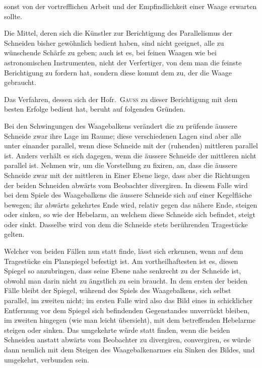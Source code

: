 \par\clearpage
{}
\noindent sonst von der vortrefflichen Arbeit und der Empfindlichkeit einer Waage erwarten sollte.

Die Mittel, deren sich die Künstler zur Berichtigung des Parallelismus der Schneiden bisher gewöhnlich bedient haben, sind nicht geeignet, alle zu wünschende Schärfe zu geben; auch ist es, bei feinen Waagen wie bei astronomischen Instrumenten, nicht der Verfertiger, von dem man die feinste Berichtigung zu fordern hat, sondern diese kommt dem zu, der die Waage gebraucht.

Das Verfahren, dessen sich der Hofr.\ \textsc{Gauss} zu dieser Berichtigung mit dem besten Erfolge bedient hat, beruht auf folgenden Gründen.

Bei den Schwingungen des Waagebalkens verändert die zu prüfende äussere Schneide zwar ihre Lage im Raume; diese verschiedenen Lagen sind aber alle unter einander parallel, wenn diese Schneide mit der (ruhenden) mittleren parallel ist. Anders verhält es sich dagegen, wenn die äussere Schneide der mittleren nicht parallel ist. Nehmen wir, um die Vorstellung zu fixiren, an, dass die äussere Schneide zwar mit der mittleren in Einer Ebene liege, dass aber die Richtungen der beiden Schneiden abwärts vom Beobachter divergiren. In diesem Falle wird bei dem Spiele des Waagebalkens die äussere Schneide sich auf einer Kegelfläche bewegen; ihr abwärts gekehrtes Ende wird, relativ gegen das nähere Ende, steigen oder sinken, so wie der Hebelarm, an welchem diese Schneide sich befindet, steigt oder sinkt. Dasselbe wird von dem die Schneide stets berührenden Tragestücke gelten.

Welcher von beiden Fällen nun statt finde, lässt sich erkennen, wenn auf dem Tragestücke ein Planspiegel befestigt ist. Am vortheilhaftesten ist es, diesen Spiegel so anzubringen, dass seine Ebene nahe senkrecht zu der Schneide ist, obwohl man darin nicht zu ängstlich zu sein braucht. In dem ersten der beiden Fälle bleibt der Spiegel, während des Spiels des Waagebalkens, sich selbst parallel, im zweiten nicht; im ersten Falle wird also das Bild eines in schicklicher Entfernung vor dem Spiegel sich befindenden Gegenstandes unverrückt bleiben, im zweiten hingegen (wie man leicht übersieht), mit dem betreffenden Hebelarme steigen oder sinken. Das umgekehrte würde statt finden, wenn die beiden Schneiden anstatt abwärts vom Beobachter zu divergiren, convergiren, es würde dann nemlich mit dem Steigen des Waagebalkenarmes ein Sinken des Bildes, und umgekehrt, verbunden sein.

